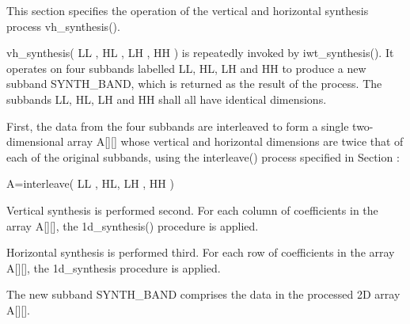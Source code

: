 This section specifies the operation of the vertical and horizontal
synthesis process vh\_synthesis().

vh\_synthesis( LL , HL , LH , HH ) is repeatedly invoked by
iwt\_synthesis(). It operates on four subbands labelled LL, HL, LH and HH
to produce a new subband SYNTH\_BAND, which is returned as the result of
the process. The subbands LL, HL, LH and HH shall all have identical
dimensions.

First, the data from the four subbands are interleaved to form a single
two-dimensional array A[][] whose vertical and horizontal dimensions are
twice that of each of the original subbands, using the interleave()
process specified in Section :

A=interleave( LL , HL, LH , HH )

Vertical synthesis is performed second. For each column of coefficients
in the array A[][], the 1d\_synthesis() procedure is applied.

Horizontal synthesis is performed third. For each row of coefficients in
the array A[][], the 1d\_synthesis procedure is applied.

The new subband SYNTH\_BAND comprises the data in the processed 2D array
A[][].


